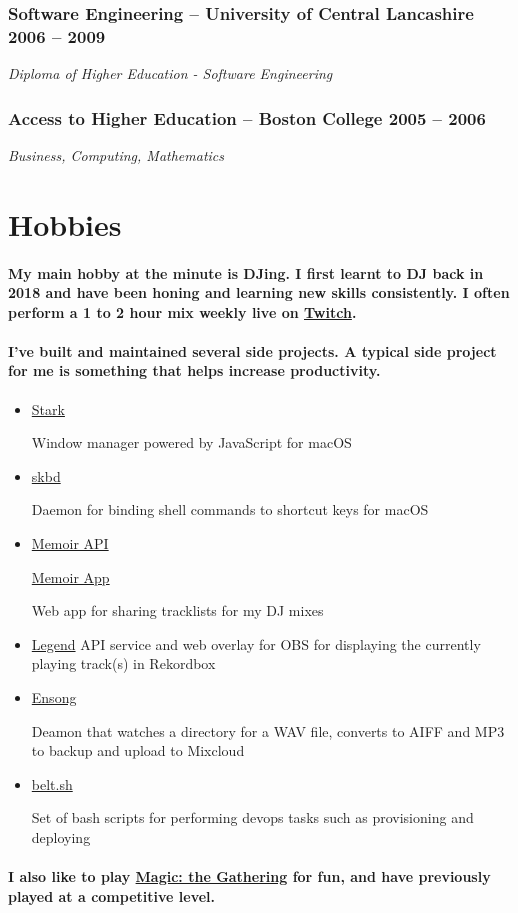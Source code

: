 \documentclass[a4paper]{article}
\newcommand{\datedsubsection}[2]{
  \subsubsection{#1 \hfill \textbf{#2}}
}
\newcommand{\languagetag}[1]{
  \raisebox{0.3\height}{\tiny #1}
}
\begin{document}
\datedsubsection{\textbf{Software Engineering} -- University of Central
Lancashire}{2006 -- 2009}
\textit{Diploma of Higher Education - Software Engineering}

\datedsubsection{\textbf{Access to Higher Education} -- Boston College}{2005 --
2006}
\textit{Business, Computing, Mathematics}

\section{Hobbies}
\paragraph{My main hobby at the minute is DJing. I first learnt to DJ back in
2018 and have been honing and learning new skills consistently. I often perform
a 1 to 2 hour mix weekly live on \href{https://twitch.tv/iamdjriff}{Twitch}.}

\paragraph{I've built and maintained several side projects. A typical side
project for me is something that helps increase productivity.}

\begin{itemize}
  \item \href{https://github.com/starkwm/stark}{Stark} \languagetag{(Swift)}
    Window manager powered by JavaScript for macOS
  \item \href{https://github.com/tombell/skbd}{skbd} \languagetag{(Swift)}
    Daemon for binding shell commands to shortcut keys for macOS
  \item \href{https://github.com/tombell/memoir}{Memoir API} \languagetag{(Go)}
    \href{https://github.com/tombell/memoir-app}{Memoir App}
    \languagetag{(TypeScript, Preact)} Web app for sharing tracklists for my DJ
    mixes
  \item \href{https://github.com/tombell/legend}{Legend} \languagetag{(Go,
    TypeScript, Preact)} API service and web overlay for OBS for displaying the
    currently playing track(s) in Rekordbox
  \item \href{https://github.com/tombell/ensong}{Ensong} \languagetag{(Go)}
    Deamon that watches a directory for a WAV file, converts to AIFF and MP3 to
    backup and upload to Mixcloud
  \item \href{https://github.com/belt-project/belt.sh}{belt.sh}
    \languagetag{(Bash)} Set of bash scripts for performing devops tasks such as
    provisioning and deploying
\end{itemize}

\paragraph{I also like to play \href{https://magic.wizards.com/en}{Magic: the
Gathering} for fun, and have previously played at a competitive level.}
\end{document}
